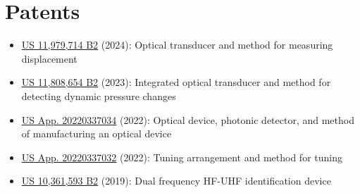 \documentclass[11pt,a4paper]{article}
\begin{document}
	\section*{Patents}
	\begin{itemize}
		\item \href{https://patents.justia.com/patent/11979714}{US 11,979,714 B2} (2024): Optical transducer and method for measuring displacement
		\item \href{https://patents.justia.com/patent/11808654}{US 11,808,654 B2} (2023): Integrated optical transducer and method for detecting dynamic pressure changes
		\item \href{https://patents.justia.com/patent/20220337034}{US App. 20220337034} (2022): Optical device, photonic detector, and method of manufacturing an optical device
		\item \href{https://patents.justia.com/patent/20220337032}{US App. 20220337032} (2022): Tuning arrangement and method for tuning
		\item \href{https://patents.justia.com/patent/10361593}{US 10,361,593 B2} (2019): Dual frequency HF-UHF identification device
	\end{itemize}
	
\end{document}
